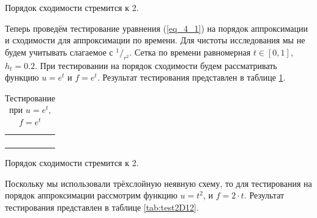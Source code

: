 Порядок сходимости стремится к 2.

Теперь проведём тестирование уравнения (\ref{eq_4_1}) на порядок аппроксимации и сходимости для аппроксимации по времени. Для чистоты исследования мы не будем учитывать слагаемое с ${}^1/_{r^2}$. Сетка по времени равномерная $t \in [0, 1]$, $h_t = 0.2$. При тестировании на порядок сходимости будем рассматривать функцию $u = e^t$ и $f = e^t$. Результат тестирования представлен в таблице \ref{tab:test2D11}.

\begin{table}
	\caption{Тестирование при $u = e^t$, $f = e^t$}
	\centering
	\small
	\begin{tabularx}{1.0\textwidth}{| >{\raggedright\arraybackslash}X | >{\raggedright\arraybackslash}X | >{\raggedright\arraybackslash}X |>{\raggedright\arraybackslash}X |}
		\hline
		\centering{Количество разбиений} & \centering{Средняя погрешность} & \centering{$\text{log}_2\left(\frac{\sigma_{i-1}}{\sigma_i}\right)$} \tabularnewline \hline		
		
		\centering{4} & \centering{8.4940866E-003} & \centering{-} \tabularnewline \hline
		
		\centering{8} & \centering{2.4848144E-003} & \centering{1.77332095} \tabularnewline \hline
		
		\centering{16} & \centering{6.6533732E-004} & \centering{1.90098023} \tabularnewline \hline
		
		\centering{32} & \centering{1.7191414E-004} & \centering{1.95239775} \tabularnewline \hline
		
	\end{tabularx}
	\label{tab:test2D11}
\end{table}

Порядок сходимости стремится к 2.

Поскольку мы использовали трёхслойную неявную схему, то для тестирования на порядок аппроксимации рассмотрим функцию $u = t^2$, и $f = 2 \cdot t$. Результат  тестирования представлен в таблице \ref{tab:test2D12}.


